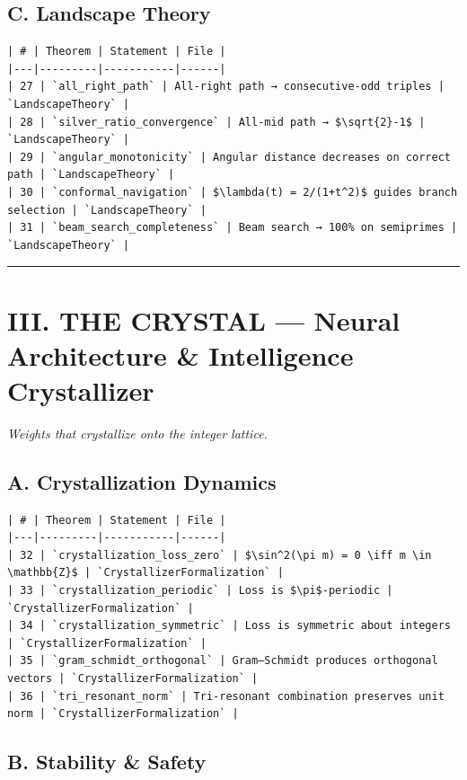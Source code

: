 \documentclass[12pt,a4paper,openany]{book}
\begin{document}
\subsection{C. Landscape Theory}

\begin{verbatim}
| # | Theorem | Statement | File |
|---|---------|-----------|------|
| 27 | `all_right_path` | All-right path → consecutive-odd triples | `LandscapeTheory` |
| 28 | `silver_ratio_convergence` | All-mid path → $\sqrt{2}-1$ | `LandscapeTheory` |
| 29 | `angular_monotonicity` | Angular distance decreases on correct path | `LandscapeTheory` |
| 30 | `conformal_navigation` | $\lambda(t) = 2/(1+t^2)$ guides branch selection | `LandscapeTheory` |
| 31 | `beam_search_completeness` | Beam search → 100% on semiprimes | `LandscapeTheory` |
\end{verbatim}

\bigskip\hrule\bigskip

\section{III. THE CRYSTAL — Neural Architecture \& Intelligence Crystallizer}

\textit{Weights that crystallize onto the integer lattice.}

\subsection{A. Crystallization Dynamics}

\begin{verbatim}
| # | Theorem | Statement | File |
|---|---------|-----------|------|
| 32 | `crystallization_loss_zero` | $\sin^2(\pi m) = 0 \iff m \in \mathbb{Z}$ | `CrystallizerFormalization` |
| 33 | `crystallization_periodic` | Loss is $\pi$-periodic | `CrystallizerFormalization` |
| 34 | `crystallization_symmetric` | Loss is symmetric about integers | `CrystallizerFormalization` |
| 35 | `gram_schmidt_orthogonal` | Gram–Schmidt produces orthogonal vectors | `CrystallizerFormalization` |
| 36 | `tri_resonant_norm` | Tri-resonant combination preserves unit norm | `CrystallizerFormalization` |
\end{verbatim}

\subsection{B. Stability \& Safety}
\end{document}
